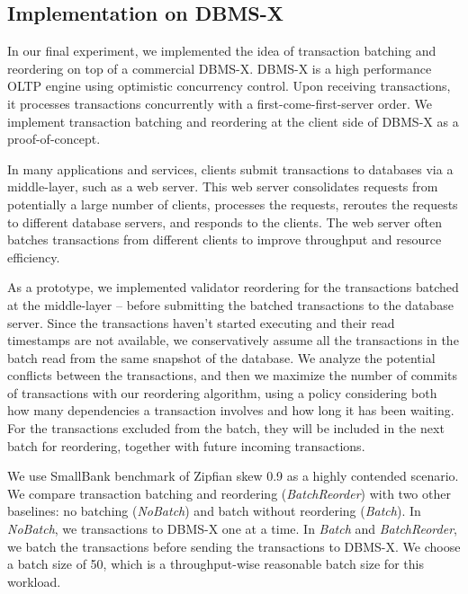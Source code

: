 \subsection{Implementation on DBMS-X}
\label{subsec:experiment:compare}

In our final experiment, we implemented the idea of transaction batching and reordering on top of a commercial DBMS-X. DBMS-X is a high performance OLTP engine using optimistic concurrency control. Upon receiving transactions, it processes transactions concurrently with a first-come-first-server order. We implement transaction batching and reordering at the client side of DBMS-X as a proof-of-concept.

In many applications and services, clients submit transactions to databases via a middle-layer, such as a web server. This web server consolidates requests from potentially a large number of clients, processes the requests, reroutes the requests to different database servers, and responds to the clients. The web server often batches transactions from different clients to improve throughput and resource efficiency. 

As a prototype, we implemented validator reordering for the transactions batched at the middle-layer -- before submitting the batched transactions to the database server. Since the transactions haven't started executing and their read timestamps are not available, we conservatively assume all the transactions in the batch read from the same snapshot of the database. We analyze the potential conflicts between the transactions, and then we maximize the number of commits of transactions with our reordering algorithm, using a policy considering both how many dependencies a transaction involves and how long it has been waiting. For the transactions excluded from the batch, they will be included in the next batch for reordering, together with future incoming transactions.

We use SmallBank benchmark of Zipfian skew 0.9 as a highly contended scenario. We compare transaction batching and reordering (\emph{BatchReorder}) with two other baselines: no batching (\emph{NoBatch}) and batch without reordering (\emph{Batch}). In \emph{NoBatch}, we transactions to DBMS-X one at a time. In \emph{Batch} and \emph{BatchReorder}, we batch the transactions before sending the transactions to DBMS-X. We choose a batch size of 50, which is a throughput-wise reasonable batch size for this workload.

